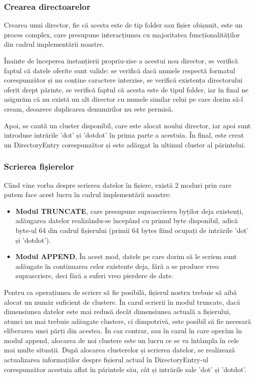 \subsubsection{Crearea directoarelor}

Crearea unui director, fie că acesta este de tip folder sau fișier obișnuit, este un proces complex, care presupune interacțiunea cu majoritatea funcționalităților din cadrul implementării noastre.

Înainte de începerea instanțierii propriu-zise a acestui nou director, se verifică faptul că datele oferite sunt valide: se verifică dacă numele respectă formatul corespunzător și nu conține caractere interzise, se verifică existența directorului oferit drept părinte, se verifică faptul că acesta este de tipul folder, iar în final ne asigurăm că nu există un alt director cu numele similar celui pe care dorim să-l cream, deoarece duplicarea denumirilor nu este permisă.

Apoi, se caută un cluster disponibil, care este alocat noului director, iar apoi sunt introduse intrările 'dot' și 'dotdot' în prima parte a acestuia. În final, este creat un DirectoryEntry corespunzător și este adăugat în ultimul cluster al părintelui.


\subsubsection{Scrierea fișierelor}

Când vine vorba despre scrierea datelor în fișiere, există 2 moduri prin care putem face acest lucru în cadrul implementării noastre:

\begin{itemize}
  \item \textbf{Modul TRUNCATE}, care presupune suprascrierea byților deja existenți, adăugarea datelor realizându-se începând cu primul byte disponibil, adică byte-ul 64 din cadrul fișierului (primii 64 bytes fiind ocupați de intrările 'dot' și 'dotdot').

  \item \textbf{Modul APPEND}, În acest mod, datele pe care dorim să le scriem sunt adăugate în continuarea celor existente deja, fără a se produce vreo suprascriere, deci fără a suferi vreo pierdere de date.
\end{itemize}

Pentru ca operațiunea de scriere să fie posibilă, fișierul nostru trebuie să aibă alocat un număr suficient de clustere. În cazul scrierii în modul truncate, dacă dimensiunea datelor este mai redusă decât dimensiunea actuală a fișierului, atunci nu mai trebuie adăugate clustere, ci dimpotrivă, este posibil să fie necesară eliberarea unei părți din acestea. În caz contrar, sau în cazul în care operăm în modul append, alocarea de noi clustere este un lucru ce se va întâmpla în cele mai multe situații. După alocarea clusterelor și scrierea datelor, se realizează actualizarea informațiilor despre fișierul actual în DirectoryEntry-ul corespunzător acestuia aflat în părintele său, cât și intrările sale 'dot' și 'dotdot'.


